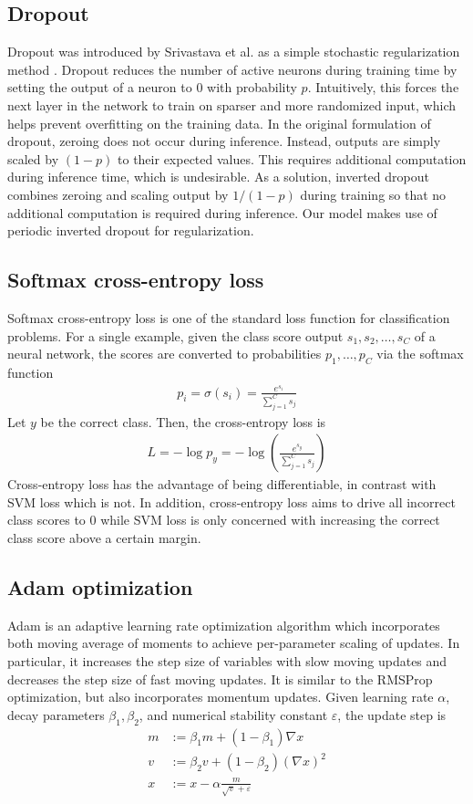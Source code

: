\documentclass[10pt,twocolumn,letterpaper]{article}
\begin{document}
\subsection{Dropout}
Dropout was introduced by Srivastava et al. as a simple stochastic regularization method \cite{srivastava2014dropout}. Dropout reduces the number of active neurons during training time by setting the output of a neuron to 0 with probability $p$. Intuitively, this forces the next layer in the network to train on sparser and more randomized input, which helps prevent overfitting on the training data. In the original formulation of dropout, zeroing does not occur during inference. Instead, outputs are simply scaled by $(1 - p)$ to their expected values. This requires additional computation during inference time, which is undesirable. As a solution, inverted dropout combines zeroing and scaling output by $1 / (1 - p)$ during training so that no additional computation is required during inference. Our model makes use of periodic inverted dropout for regularization.


\subsection{Softmax cross-entropy loss}
Softmax cross-entropy loss is one of the standard loss function for classification problems. For a single example, given the class score output $s_1, s_2, \dots, s_C$ of a neural network, the scores are converted to probabilities $p_1, \dots, p_C$ via the softmax function 
\begin{align}
p_i = \sigma(s_i) = \frac{e^{s_i}}{\sum_{j = 1}^C s_j}
\end{align}
 Let $y$ be the correct class. Then, the cross-entropy loss is 
 \begin{align}
 L = -\log p_y = -\log \left( \frac{e^{s_y}}{\sum_{j = 1}^C s_j} \right)
 \end{align}
  Cross-entropy loss has the advantage of being differentiable, in contrast with SVM loss which is not. In addition, cross-entropy loss aims to drive all incorrect class scores to 0 while SVM loss is only concerned with increasing the correct class score above a certain margin.

\subsection{Adam optimization}
Adam is an adaptive learning rate optimization algorithm which incorporates both moving average of moments to achieve per-parameter scaling of updates. In particular, it increases the step size of variables with slow moving updates and decreases the step size of fast moving updates. It is similar to the RMSProp optimization, but also incorporates momentum updates. Given learning rate $\alpha$, decay parameters $\beta_1, \beta_2$, and numerical stability constant $\varepsilon$, the update step is
\begin{align}
m &:= \beta_1 m + (1 - \beta_1) \nabla x \\
v &:= \beta_2 v + (1 - \beta_2) (\nabla x)^2 \\
x &:= x - \alpha \frac{m}{\sqrt{v} + \varepsilon}
\end{align}
\end{document}
